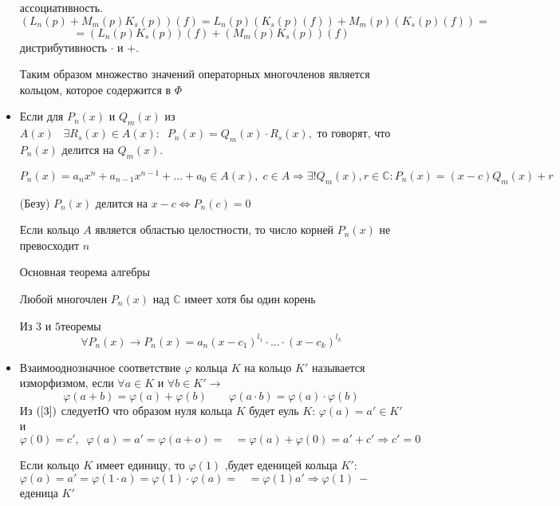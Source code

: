 \begin{itemize}
    ассоциативность. $$(L_n(p)+M_m(p)K_s(p))(f)=L_n(p)(K_s(p)(f))+M_m(p)(K_s(p)(f))= $$ 
    $$ = (L_n(p)K_s(p))(f)+(M_m(p)K_s(p))(f)$$дистрибутивность $\cdot $ и $+$.\par
    Таким образом множество значений операторных многочленов является кольцом, которое содержится в $\varPhi$
    \item Если для $P_n(x)$ и $Q_m(x)$ из $A(x)\;\;\;\exists R_s(x)\in A(x): \;\;P_n(x)=Q_m(x)\cdot R_s(x),$ то говорят, что $P_n(x)$ делится на $Q_m(x)$.
    \begin{theorem}
    $$P_n(x) = a_n x^n + a_{n-1} x^{n-1} + \dots + a_0 \in A(x),\;c \in A \Rightarrow \exists ! Q_m(x), r\in \mathds{C}:P_n(x)=(x-c)Q_m(x)+r$$
    \end{theorem}
    \begin{theorem}
    (Безу) $P_n(x)$ делится на $x-c\Leftrightarrow P_n(c)=0$
    \end{theorem}
    \begin{theorem}
    Если кольцо $A$ является областью целостности, то число корней $P_n(x)$ не превосходит $n$
    \end{theorem}
    \begin{theorem}
    Основная теорема алгебры \par
    Любой многочлен $P_n(x)$ над $\mathds{C}$ имеет хотя бы один корень
    \end{theorem}
    \begin{proposition}
    Из $3$ и $5$теоремы \begin{equation}
        \forall P_n(x)\rightarrow P_n(x)=a_n(x-c_1)^{l_1}\cdot ... 
    \cdot (x-c_k)^{l_k} 
    \end{equation}
    \end{proposition}
    \item Взаимооднозначное соответствие $\varphi$ кольца $K$ на кольцо $K'$ называется изморфизмом, если $\forall a\in K $ и $\forall b\in K'\rightarrow$
    \begin{equation}
    \label{3}
        \varphi(a+b)=\varphi(a)+\varphi(b)\;\;\;\;\;\;\;\varphi(a\cdot b)=\varphi(a)\cdot\varphi(b)
    \end{equation}
    Из $(\ref{3})$ следуетЮ что образом нуля кольца $K$ будет еуль $K$: $\varphi(a)=a'\in K'$ и $\varphi(0)=c',\;\;\varphi(a)=a'=\varphi(a+o)=\;\;\;=\varphi(a)+\varphi(0)=a'+c'\Rightarrow c'=0$\par
    Если кольцо $K$ имеет единицу, то $\varphi(1)$ ,будет еденицей кольца $K'$: $\varphi(a)=a'=\varphi(1\cdot a )= \varphi(1)\cdot \varphi(a) =\;\;\;= \varphi(1) a'\Rightarrow\varphi(1)~-~$ еденица $K'$ 

\end{itemize}
